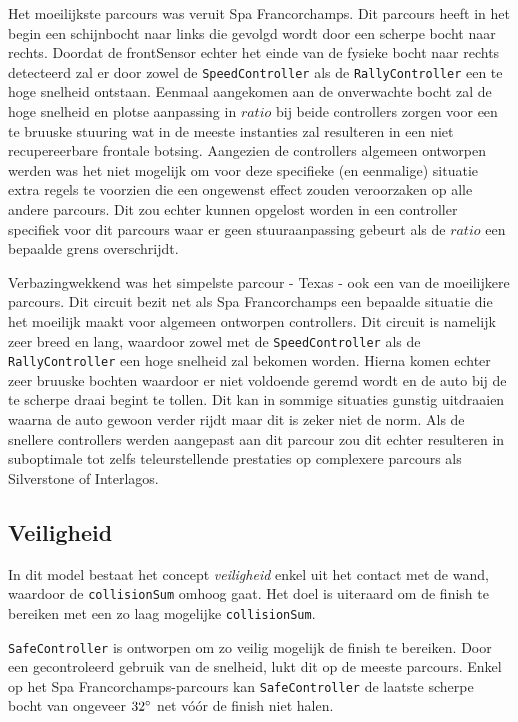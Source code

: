 \documentclass[10pt,a4paper]{article}
\begin{document}
			Het moeilijkste parcours was veruit Spa Francorchamps. Dit parcours heeft in het begin een schijnbocht naar links die gevolgd wordt door een scherpe bocht naar rechts. Doordat de frontSensor echter het einde van de fysieke bocht naar rechts detecteerd zal er door zowel de \texttt{SpeedController} als de \texttt{RallyController} een te hoge snelheid ontstaan. Eenmaal aangekomen aan de onverwachte bocht zal de hoge snelheid en plotse aanpassing in $ratio$ bij beide controllers zorgen voor een te bruuske stuuring wat in de meeste instanties zal resulteren in een niet recupereerbare frontale botsing. Aangezien de controllers algemeen ontworpen werden was het niet mogelijk om voor deze specifieke (en eenmalige) situatie extra regels te voorzien die een ongewenst effect zouden veroorzaken op alle andere parcours. Dit zou echter kunnen opgelost worden in een controller specifiek voor dit parcours waar er geen stuuraanpassing gebeurt als de $ratio$ een bepaalde grens overschrijdt.

			Verbazingwekkend was het simpelste parcour - Texas - ook een van de moeilijkere parcours. Dit circuit bezit net als Spa Francorchamps een bepaalde situatie die het moeilijk maakt voor algemeen ontworpen controllers. Dit circuit is namelijk zeer breed en lang, waardoor zowel met de \texttt{SpeedController} als de \texttt{RallyController} een hoge snelheid zal bekomen worden. Hierna komen echter zeer bruuske bochten waardoor er niet voldoende geremd wordt en de auto bij de te scherpe draai begint te tollen. Dit kan in sommige situaties gunstig uitdraaien waarna de auto gewoon verder rijdt maar dit is zeker niet de norm. Als de snellere controllers werden aangepast aan dit parcour zou dit echter resulteren in suboptimale tot zelfs teleurstellende prestaties op complexere parcours als Silverstone of Interlagos.

		\subsection{Veiligheid}
			In dit model bestaat het concept \textit{veiligheid} enkel uit het contact met de wand, waardoor de \texttt{collisionSum} omhoog gaat. Het doel is uiteraard om de finish te bereiken met een zo laag mogelijke \texttt{collisionSum}.

			\texttt{SafeController} is ontworpen om zo veilig mogelijk de finish te bereiken. Door een gecontroleerd gebruik van de snelheid, lukt dit op de meeste parcours. Enkel op het Spa Francorchamps-parcours kan \texttt{SafeController} de laatste scherpe bocht van ongeveer $32 \degree$ net v\'o\'or de finish niet halen.\\
\end{document}

